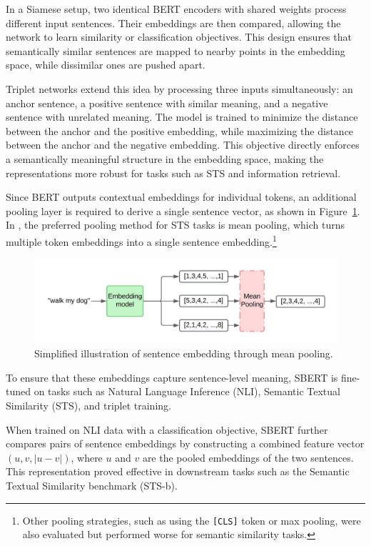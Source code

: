 In a Siamese setup, two identical BERT encoders with shared weights process different input sentences. Their embeddings are then compared, allowing the network to learn similarity or classification objectives. This design ensures that semantically similar sentences are mapped to nearby points in the embedding space, while dissimilar ones are pushed apart.

Triplet networks extend this idea by processing three inputs simultaneously: an anchor sentence, a positive sentence with similar meaning, and a negative sentence with unrelated meaning. The model is trained to minimize the distance between the anchor and the positive embedding, while maximizing the distance between the anchor and the negative embedding. This objective directly enforces a semantically meaningful structure in the embedding space, making the representations more robust for tasks such as \ac{STS} and information retrieval.

Since BERT outputs contextual embeddings for individual tokens, an additional pooling layer is required to derive a single sentence vector, as shown in Figure~\ref{fig:Sentence_embedding}. In \cite{reimers2019sentencebertsentenceembeddingsusing}, the preferred pooling method for \ac{STS} tasks is mean pooling, which turns multiple token embeddings into a single sentence embedding.\footnote{Other pooling strategies, such as using the \texttt{[CLS]} token or max pooling, were also evaluated but performed worse for semantic similarity tasks.}

\begin{figure}[h!]
    \centering
    \includegraphics[width=1\linewidth]{Figures/Sentence_Embedding.jpeg}
    \caption{Simplified illustration of sentence embedding through mean pooling.}
    \label{fig:Sentence_embedding}
\end{figure}

To ensure that these embeddings capture sentence-level meaning, SBERT is fine-tuned on tasks such as Natural Language Inference (NLI), Semantic Textual Similarity (STS), and triplet training. 

When trained on NLI data with a classification objective, SBERT further compares pairs of sentence embeddings by constructing a combined feature vector $(u, v, |u-v|)$, where $u$ and $v$ are the pooled embeddings of the two sentences. This representation proved effective in downstream tasks such as the Semantic Textual Similarity benchmark (STS-b).

